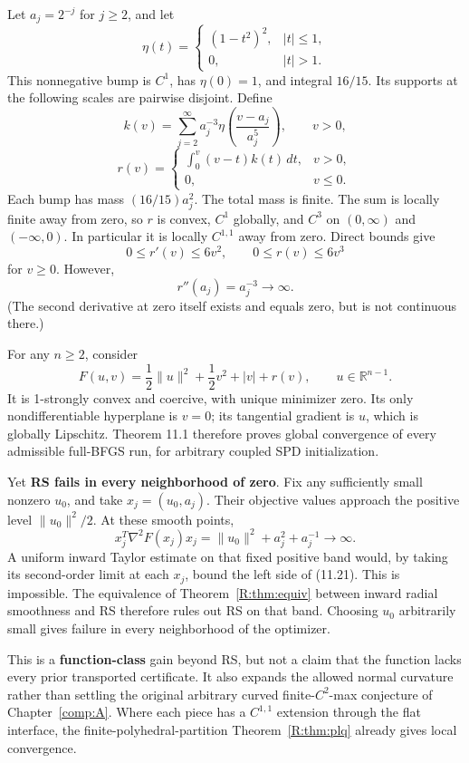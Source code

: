 Let \(a_j=2^{-j}\) for \(j\ge2\), and let \[
 \eta(t)=\begin{cases}(1-t^2)^2,&|t|\le1,\\0,&|t|>1.\end{cases}
\] This nonnegative bump is \(C^1\), has \(\eta(0)=1\), and integral
\(16/15\). Its supports at the following scales are pairwise disjoint.
Define \[
 k(v)=\sum_{j=2}^{\infty}a_j^{-3}
 \eta\!\left(\frac{v-a_j}{a_j^5}\right),\qquad v>0,
\] \[
 r(v)=\begin{cases}
 \displaystyle\int_0^v(v-t)k(t)\,dt,&v>0,\\
 0,&v\le0.
 \end{cases}\tag{11.18}
\] Each bump has mass \((16/15)a_j^2\). The total mass is finite. The
sum is locally finite away from zero, so \(r\) is convex, \(C^1\)
globally, and \(C^3\) on \((0,\infty)\) and \((-\infty,0)\). In
particular it is locally \(C^{1,1}\) away from zero. Direct bounds give
\[
 0\le r'(v)\le6v^2,\qquad 0\le r(v)\le6v^3
\] for \(v\ge0\). However, \[
 r''(a_j)=a_j^{-3}\to\infty.\tag{11.19}
\] (The second derivative at zero itself exists and equals zero, but is
not continuous there.)

For any \(n\ge2\), consider \[
 \boxed{
 F(u,v)=\frac12\|u\|^2+\frac12v^2+|v|+r(v),
 \qquad u\in\mathbb R^{n-1}.
 }\tag{11.20}
\] It is 1-strongly convex and coercive, with unique minimizer zero. Its
only nondifferentiable hyperplane is \(v=0\); its tangential gradient is
\(u\), which is globally Lipschitz. Theorem 11.1 therefore proves global
convergence of every admissible full-BFGS run, for arbitrary coupled SPD
initialization.

Yet \textbf{RS fails in every neighborhood of zero}. Fix any
sufficiently small nonzero \(u_0\), and take \(x_j=(u_0,a_j)\). Their
objective values approach the positive level \(\|u_0\|^2/2\). At these
smooth points, \[
 x_j^T\nabla^2F(x_j)x_j
 =\|u_0\|^2+a_j^2+a_j^{-1}\longrightarrow\infty.\tag{11.21}
\] A uniform inward Taylor estimate on that fixed positive band would,
by taking its second-order limit at each \(x_j\), bound the left side of
(11.21). This is impossible. The equivalence of Theorem~\ref{R:thm:equiv} between inward radial
smoothness and RS therefore rules out RS on that band. Choosing \(u_0\)
arbitrarily small gives failure in every neighborhood of the optimizer.

This is a \textbf{function-class} gain beyond RS, but not a claim that
the function lacks every prior transported certificate. It also expands
the allowed normal curvature rather than settling the original arbitrary
curved finite-\(C^2\)-max conjecture of Chapter~\ref{comp:A}. Where each piece has a \(C^{1,1}\)
extension through the flat interface, the
finite-polyhedral-partition Theorem~\ref{R:thm:plq} already gives local convergence.

